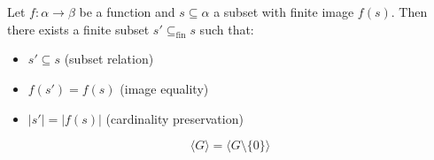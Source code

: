         \begin{lemma}\label{finset_subset_preimage_of_finite_image}
          
          \leanok
          Let $f: \alpha \to \beta$ be a function and $s \subseteq \alpha$ a subset with finite image $f(s)$. Then there exists a finite subset $s' \subseteq_{\text{fin}} s$ such that:
\begin{itemize}
\item $s' \subseteq s$ (subset relation)
\item $f(s') = f(s)$ (image equality)
\item $|s'| = |f(s)|$ (cardinality preservation)
\end{itemize}

        \end{lemma}

        \begin{lemma}\label{Submodule.span_sdiff_singleton_zero}
          
          \leanok
          \[
  \langle G \rangle = \langle G \setminus \{0\} \rangle
\]

        \end{lemma}